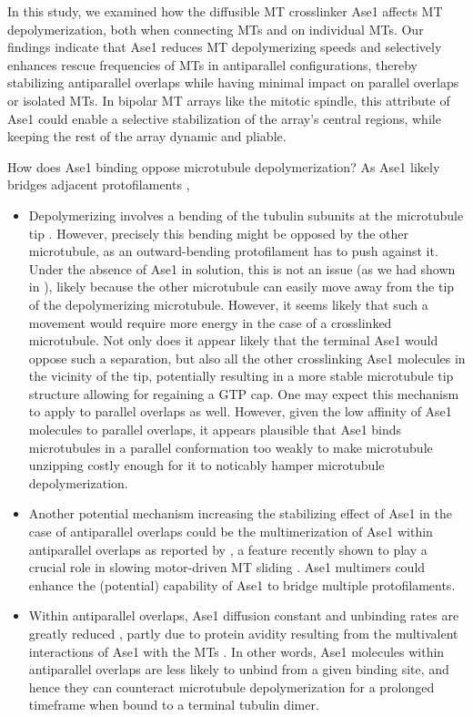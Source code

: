 In this study, we examined how the diffusible MT crosslinker Ase1 affects MT depolymerization, both when connecting MTs and on individual MTs. Our findings indicate that Ase1 reduces MT depolymerizing speeds and selectively enhances rescue frequencies of MTs in antiparallel configurations, thereby stabilizing antiparallel overlaps while having minimal impact on parallel overlaps or isolated MTs. In bipolar MT arrays like the mitotic spindle, this attribute of Ase1 could enable a selective stabilization of the array's central regions, while keeping the rest of the array dynamic and pliable.\par

How does Ase1 binding oppose microtubule depolymerization? As Ase1 likely bridges adjacent protofilaments , 

\begin{itemize}
    \item Depolymerizing involves a bending of the tubulin subunits at the microtubule tip . However, precisely this bending might be opposed by the other microtubule, as an outward-bending protofilament has to push against it. Under the absence of Ase1 in solution, this is not an issue (as we had shown in ), likely because the other microtubule can easily move away from the tip of the depolymerizing microtubule. However, it seems likely that such a movement would require more energy in the case of a crosslinked microtubule. Not only does it appear likely that the terminal Ase1 would oppose such a separation, but also all the other crosslinking Ase1 molecules in the vicinity of the tip, potentially resulting in a more stable microtubule tip structure allowing for regaining a GTP cap. One may expect this mechanism to apply to parallel overlaps as well. However, given the low affinity of Ase1 molecules to parallel overlaps, it appears plausible that Ase1 binds microtubules in a parallel conformation too weakly to make microtubule unzipping costly enough for it to noticably hamper microtubule depolymerization.
    \item Another potential mechanism increasing the stabilizing effect of Ase1 in the case of antiparallel overlaps could be the multimerization of Ase1 within antiparallel overlaps as reported by \cite{Kapitein2008}, a feature recently shown to play a crucial role in slowing motor-driven MT sliding \parencite{alfieri2021two}. Ase1 multimers could enhance the (potential) capability of Ase1 to bridge multiple protofilaments.
    \item Within antiparallel overlaps, Ase1 diffusion constant and unbinding rates are greatly reduced \parencite{Kapitein2008, lanskydiffusible2015}, partly due to protein avidity resulting from the multivalent interactions of Ase1 with the MTs \parencite{braun2020cytoskeletal, erlendsson2021binding}. In other words, Ase1 molecules within antiparallel overlaps are less likely to unbind from a given binding site, and hence they can counteract microtubule depolymerization for a prolonged timeframe when bound to a terminal tubulin dimer.
\end{itemize}
